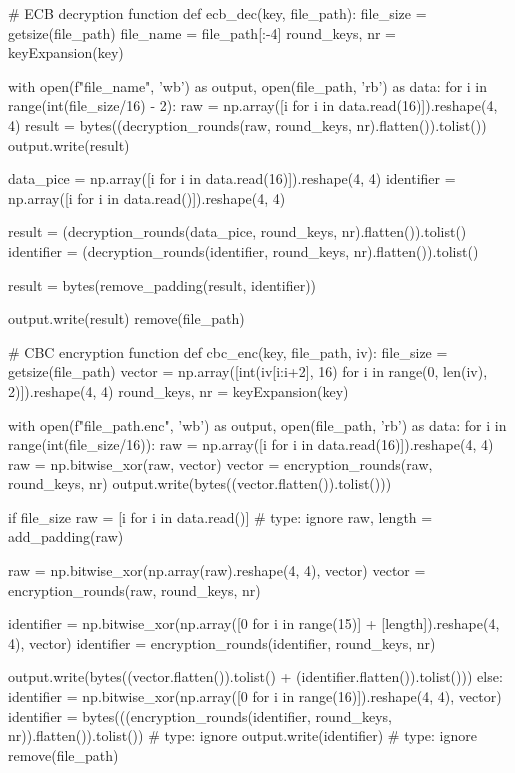 \begin{python}
# ECB decryption function
def ecb_dec(key, file_path):
    file_size = getsize(file_path)
    file_name = file_path[:-4]
    round_keys, nr = keyExpansion(key)

    with open(f"{file_name}", 'wb') as output, open(file_path, 'rb') as data:
        for i in range(int(file_size/16) - 2):
            raw = np.array([i for i in data.read(16)]).reshape(4, 4)
            result = bytes((decryption_rounds(raw, round_keys, nr).flatten()).tolist())
            output.write(result)

        data_pice = np.array([i for i in data.read(16)]).reshape(4, 4)
        identifier = np.array([i for i in data.read()]).reshape(4, 4)

        result = (decryption_rounds(data_pice, round_keys, nr).flatten()).tolist()
        identifier = (decryption_rounds(identifier, round_keys, nr).flatten()).tolist()

        result = bytes(remove_padding(result, identifier))

        output.write(result)
    remove(file_path)


# CBC encryption function
def cbc_enc(key, file_path, iv):
    file_size = getsize(file_path)
    vector = np.array([int(iv[i:i+2], 16) for i in range(0, len(iv), 2)]).reshape(4, 4)
    round_keys, nr = keyExpansion(key)

    with open(f"{file_path}.enc", 'wb') as output, open(file_path, 'rb') as data:
        for i in range(int(file_size/16)):
            raw = np.array([i for i in data.read(16)]).reshape(4, 4)
            raw = np.bitwise_xor(raw, vector)
            vector = encryption_rounds(raw, round_keys, nr)
            output.write(bytes((vector.flatten()).tolist()))

        if file_size %
            raw = [i for i in data.read()]  # type: ignore
            raw, length = add_padding(raw)

            raw = np.bitwise_xor(np.array(raw).reshape(4, 4), vector)
            vector = encryption_rounds(raw, round_keys, nr)

            identifier = np.bitwise_xor(np.array([0 for i in range(15)] + [length]).reshape(4, 4), vector)
            identifier = encryption_rounds(identifier, round_keys, nr)

            output.write(bytes((vector.flatten()).tolist() + (identifier.flatten()).tolist()))
        else:
            identifier = np.bitwise_xor(np.array([0 for i in range(16)]).reshape(4, 4), vector)
            identifier = bytes(((encryption_rounds(identifier, round_keys, nr)).flatten()).tolist())  # type: ignore
            output.write(identifier)  # type: ignore
    remove(file_path)



\end{python}
